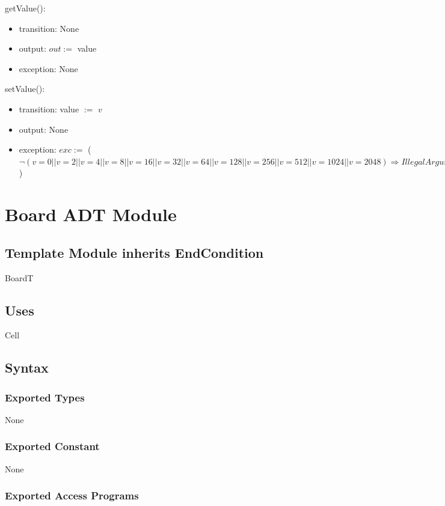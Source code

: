 \documentclass[12pt]{article}
\begin{document}
\noindent getValue():
\begin{itemize}
\item transition: None
\item output: $out :=$ value
\item exception: None
\end{itemize}

\noindent setValue():
\begin{itemize}
\item transition: value $:=$ $v$
\item output: None
\item exception: $exc :=$ ($\neg (v = 0 || v = 2 || v = 4 || v = 8 || v = 16 || v = 32 || v = 64 || v = 128 || v = 256 || v = 512 || v = 1024 || v = 2048) \Rightarrow IllegalArgumentException$)
\end{itemize}

\newpage

\section* {Board ADT Module}

\subsection*{Template Module inherits EndCondition}

BoardT 

\subsection* {Uses}

Cell

\subsection* {Syntax}

\subsubsection* {Exported Types}

None

\subsubsection* {Exported Constant}

None

\subsubsection* {Exported Access Programs}
\end{document}
